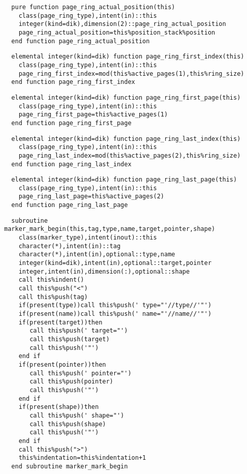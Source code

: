 \begin{Verbatim}
  pure function page_ring_actual_position(this)
    class(page_ring_type),intent(in)::this
    integer(kind=dik),dimension(2)::page_ring_actual_position
    page_ring_actual_position=this%position_stack%position
  end function page_ring_actual_position
\end{Verbatim}
 
\begin{Verbatim}
  elemental integer(kind=dik) function page_ring_first_index(this)
    class(page_ring_type),intent(in)::this
    page_ring_first_index=mod(this%active_pages(1),this%ring_size)
  end function page_ring_first_index
\end{Verbatim}

\begin{Verbatim}
  elemental integer(kind=dik) function page_ring_first_page(this)
    class(page_ring_type),intent(in)::this
    page_ring_first_page=this%active_pages(1)
  end function page_ring_first_page
\end{Verbatim}

\begin{Verbatim}
  elemental integer(kind=dik) function page_ring_last_index(this)
    class(page_ring_type),intent(in)::this
    page_ring_last_index=mod(this%active_pages(2),this%ring_size)
  end function page_ring_last_index
\end{Verbatim}

\begin{Verbatim}
  elemental integer(kind=dik) function page_ring_last_page(this)
    class(page_ring_type),intent(in)::this
    page_ring_last_page=this%active_pages(2)
  end function page_ring_last_page
\end{Verbatim}

\begin{Verbatim}
  subroutine marker_mark_begin(this,tag,type,name,target,pointer,shape)
    class(marker_type),intent(inout)::this
    character(*),intent(in)::tag
    character(*),intent(in),optional::type,name
    integer(kind=dik),intent(in),optional::target,pointer
    integer,intent(in),dimension(:),optional::shape
    call this%indent()
    call this%push("<")
    call this%push(tag)
    if(present(type))call this%push(' type="'//type//'"')
    if(present(name))call this%push(' name="'//name//'"')
    if(present(target))then
       call this%push(' target="')
       call this%push(target)
       call this%push('"')
    end if
    if(present(pointer))then
       call this%push(' pointer="')
       call this%push(pointer)
       call this%push('"')
    end if
    if(present(shape))then
       call this%push(' shape="')
       call this%push(shape)
       call this%push('"')
    end if
    call this%push(">")
    this%indentation=this%indentation+1
  end subroutine marker_mark_begin
\end{Verbatim}

